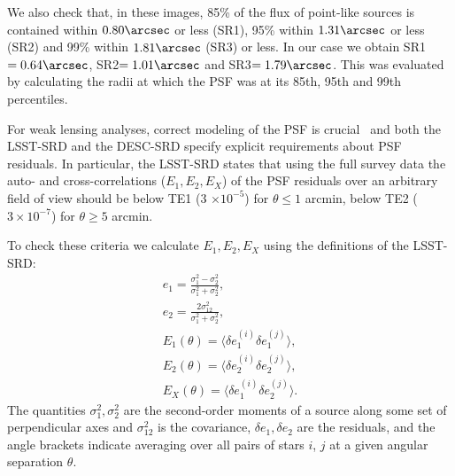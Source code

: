 \documentclass[\docopts]{\docclass}
\begin{document}
We also check that, in these images, 85\% of the flux of point-like sources is contained within $0.80\arcsec$ or less (SR1), 95\% within $1.31\arcsec$ or less (SR2) and 99\% within $1.81\arcsec$ (SR3) or less. In our case we obtain SR1$=0.64\arcsec$, SR2$=1.01\arcsec$ and SR3$=1.79\arcsec$. This was evaluated by calculating the radii at which the PSF was at its 85th, 95th and 99th percentiles.

For weak lensing analyses, correct modeling of the PSF is crucial~\citep{2004MNRAS.353..529H} and both the LSST-SRD and the DESC-SRD specify explicit requirements about PSF residuals. In particular, the LSST-SRD states that using the full survey data the auto- and cross-correlations ($E_{1}, E_{2}, E_{X}$) of the PSF residuals over an arbitrary field of view should be below TE1 (3 $\times 10^{-5}$) for $\theta \leq 1$ arcmin, below TE2 ($3 \times 10^{-7}$) for $\theta \geq 5$ arcmin. %

To check these criteria we calculate $E_{1}, E_{2}, E_{X}$ using the definitions of the LSST-SRD:
\begin{eqnarray}
e_{1} = \frac{\sigma^{2}_{1} - \sigma^{2}_{2}}{\sigma_{1}^{2}+\sigma_{2}^{2}},\\
e_{2} = \frac{2\sigma^{2}_{12}}{\sigma_{1}^{2}+\sigma_{2}^{2}},\\
E_{1} (\theta) = \langle \delta e^{(i)}_{1}\delta e^{(j)}_{1} \rangle,\\
E_{2} (\theta) = \langle \delta e^{(i)}_{2}\delta e^{(j)}_{2} \rangle,\\
E_{X} (\theta) = \langle \delta e^{(i)}_{1}\delta e^{(j)}_{2} \rangle.
\end{eqnarray}
The quantities $\sigma_{1}^{2}, \sigma_{2}^{2}$ are the second-order moments of a source along some set of perpendicular axes and $\sigma^{2}_{12}$ is the covariance, $\delta e_{1}, \delta e_{2}$ are the residuals, and the angle brackets indicate averaging over all pairs of stars $i$, $j$ at a given angular separation $\theta$.
\end{document}
